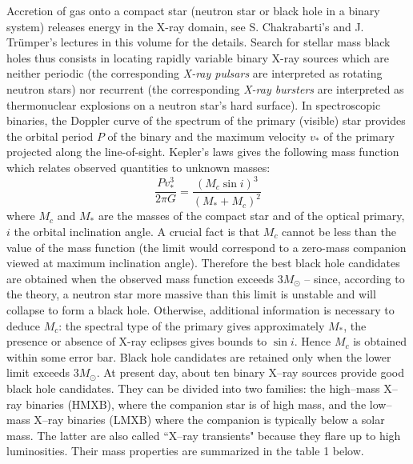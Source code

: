 \documentclass[12pt]{article}
\begin{document}
Accretion of gas onto a compact star (neutron star or black hole in 
a binary system) releases energy in the X-ray domain, see S. 
Chakrabarti's and J. Tr\"umper's lectures in this volume for the details. 
Search for stellar mass black holes thus consists in locating rapidly 
variable binary 
X-ray sources which are neither periodic (the corresponding {\it X-ray 
pulsars} 
are interpreted as rotating neutron stars) nor recurrent (the 
corresponding {\it X-ray bursters} are interpreted as thermonuclear 
explosions on a neutron star's hard surface). In spectroscopic 
binaries, the Doppler curve of the spectrum of the primary (visible) star 
provides the orbital period $P$ of the binary and the maximum 
velocity $v_{*}$ of 
the primary projected along the line-of-sight. Kepler's laws 
gives the following mass function which relates observed quantities to 
unknown masses: 
\begin{equation}
        \frac{Pv_{*}^3}{2 \pi G} = \frac{(M_{c}\sin i)^{3}}{(M_{*}+M_{c})^{2}}
        \label{luminet:15}
\end{equation}
where $M_{c}$ and $M_{*}$ are the masses of the compact star and of the 
optical primary, $i$ the orbital inclination angle.
A crucial fact is that $M_{c}$ cannot be less than the value of the 
mass function (the limit would correspond to a zero-mass companion 
viewed at maximum inclination angle). Therefore the best black hole 
candidates are obtained when the observed mass function exceeds 
$3 M_{\odot}$ -- since, according to the theory, a 
neutron star more massive than this limit is unstable and will 
collapse to form a black hole. Otherwise, additional information is 
necessary to deduce $M_{c}$: the spectral 
type of the primary gives approximately $M_{*}$, the presence or 
absence of X-ray eclipses gives bounds to $\sin i$. Hence $M_{c}$ is 
obtained within some error bar. Black hole candidates are retained 
only when the lower limit exceeds $3 M_{\odot}$. At present day, 
about ten binary X--ray 
sources provide good black hole candidates. They can be divided into 
two families: the high--mass X--ray binaries (HMXB), where the 
companion star is of high mass, and the low--mass X--ray binaries 
(LMXB) where the companion is typically below a solar mass. The latter 
are also called ``X--ray transients" because they flare up to high 
luminosities. Their mass properties are summarized in 
the table 1 below.
\end{document}
